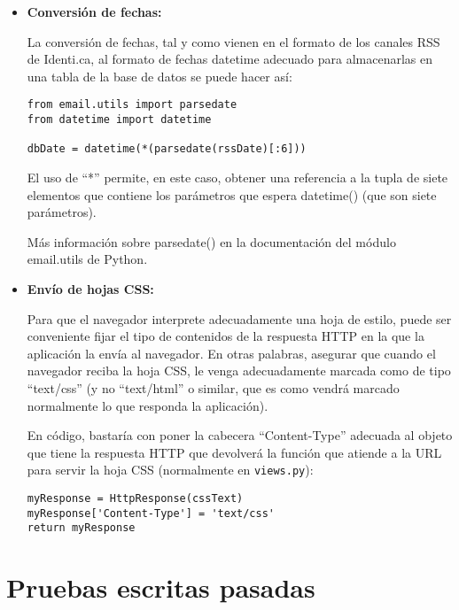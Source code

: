 \begin{itemize}
\item \textbf{Conversión de fechas:}

La conversión de fechas, tal y como vienen en el formato de los canales RSS de Identi.ca, al formato de fechas datetime adecuado para almacenarlas en una tabla de la base de datos se puede hacer así:

\begin{verbatim}
from email.utils import parsedate
from datetime import datetime

dbDate = datetime(*(parsedate(rssDate)[:6]))
\end{verbatim}

El uso de ``*'' permite, en este caso, obtener una referencia a la tupla de siete elementos que contiene los parámetros que espera datetime() (que son siete parámetros).

Más información sobre parsedate() en la documentación del módulo email.utils de Python.

\item \textbf{Envío de hojas CSS:}

Para que el navegador interprete adecuadamente una hoja de estilo, puede ser conveniente fijar el tipo de contenidos de la respuesta HTTP en la que la aplicación la envía al navegador. En otras palabras, asegurar que cuando el navegador reciba la hoja CSS, le venga adecuadamente marcada como de tipo ``text/css'' (y no ``text/html'' o similar, que es como vendrá marcado normalmente lo que responda la aplicación).

En código, bastaría con poner la cabecera ``Content-Type'' adecuada al objeto que tiene la respuesta HTTP que devolverá la función que atiende a la URL para servir la hoja CSS (normalmente en \texttt{views.py}):

\begin{verbatim}
myResponse = HttpResponse(cssText)
myResponse['Content-Type'] = 'text/css'
return myResponse
\end{verbatim}

\end{itemize}

\newpage

\section{Pruebas escritas pasadas}

